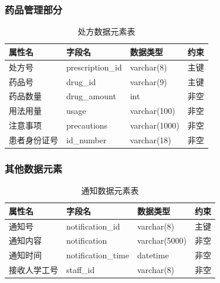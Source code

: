 \documentclass{article}
\begin{document}
\subsubsection{药品管理部分}

\begin{table}[H]
    \centering
    \begin{tabularx}{\textwidth}{|>{\raggedright\arraybackslash}X|>{\raggedright\arraybackslash}X|>{\raggedright\arraybackslash}X|>{\raggedright\arraybackslash}X|}
    \toprule
    \textbf{属性名} & \textbf{字段名} & \textbf{数据类型} & \textbf{约束} \\ \midrule
    处方号 & prescription\_id & varchar(8) & 主键 \\ \midrule
    药品号 & drug\_id & varchar(9) & 主键 \\ \midrule
    药品数量 & drug\_amount & int & 非空 \\ \midrule
    用法用量 & usage & varchar(100) & 非空 \\ \midrule
    注意事项 & precautions & varchar(1000) & 非空 \\ \midrule
    患者身份证号 & id\_number & varchar(18) & 非空 \\ \midrule
    \end{tabularx}
    \caption{处方数据元素表}
    \label{tab:prescription_elements}
\end{table}

\subsubsection{其他数据元素}

\begin{table}[H]
    \centering
    \begin{tabularx}{\textwidth}{|>{\raggedright\arraybackslash}X|>{\raggedright\arraybackslash}X|>{\raggedright\arraybackslash}X|>{\raggedright\arraybackslash}X|}
    \toprule
    \textbf{属性名} & \textbf{字段名} & \textbf{数据类型} & \textbf{约束} \\ \midrule
    通知号 & notification\_id & varchar(8) & 主键 \\ \midrule
    通知内容 & notification & varchar(5000) & 非空 \\ \midrule
    通知时间 & notification\_time & datetime & 非空 \\ \midrule
    接收人学工号 & staff\_id & varchar(8) & 非空 \\ \bottomrule
    \end{tabularx}
    \caption{通知数据元素表}
    \label{tab:notification_elements}   
\end{table}
\end{document}
